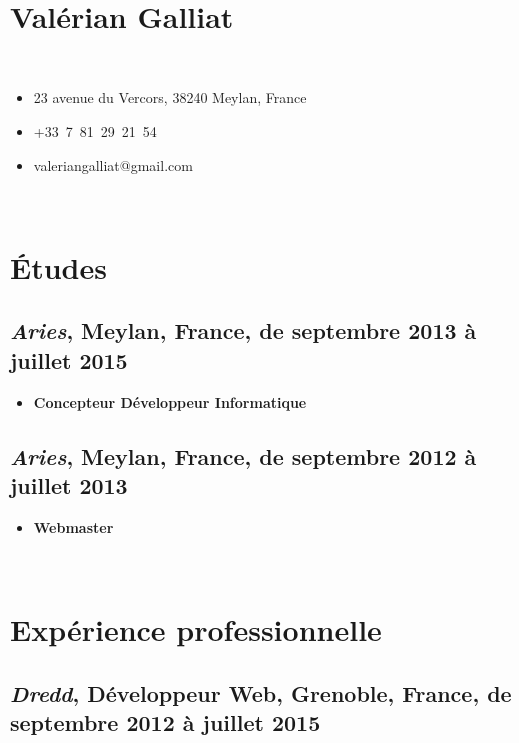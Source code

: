 \documentclass[a4paper]{article}
\begin{document}
~

\section*{\huge Valérian Galliat}

~

\begin{itemize}
  \item 23 avenue du Vercors, 38240 Meylan, France
  \item +33~7~81~29~21~54
  \item valeriangalliat@gmail.com
\end{itemize}

~

\section*{Études}

\subsection*{
  \textit{Aries},
  Meylan, France,
  de septembre 2013 à juillet 2015
}

\begin{itemize}
  \item
    \textbf{Concepteur Développeur Informatique}
\end{itemize}

\subsection*{
  \textit{Aries},
  Meylan, France,
  de septembre 2012 à juillet 2013
}

\begin{itemize}
  \item
    \textbf{Webmaster}
\end{itemize}

~

\section*{Expérience professionnelle}

\subsection*{
  \textit{Dredd},
  \textbf{Développeur Web},
  Grenoble, France,
  de septembre 2012 à juillet 2015
}
\end{document}

